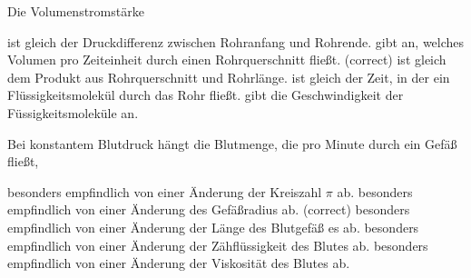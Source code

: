 \documentclass[11pt]{exam}
\begin{document}
\begin{questions}
\vspace{3mm}\question Die Volumenstromstärke

\begin{choices}
	\choice ist gleich der Druckdifferenz zwischen Rohranfang und Rohrende.
	\choice gibt an, welches Volumen pro Zeiteinheit durch einen Rohrquerschnitt fließt. (correct)
	\choice ist gleich dem Produkt aus Rohrquerschnitt und Rohrlänge.
	\choice ist gleich der Zeit, in der ein Flüssigkeitsmolekül durch das Rohr fließt.
	\choice gibt die Geschwindigkeit der Füssigkeitsmoleküle an.
\end{choices}

\vspace{3mm}\question Bei konstantem Blutdruck hängt die Blutmenge, die pro Minute durch ein Gefäß fließt,

\begin{choices}
	\choice besonders empfindlich von einer Änderung der Kreiszahl \(\pi\) ab.
	\choice besonders empfindlich von einer Änderung des Gefäßradius ab. (correct)
	\choice besonders empfindlich von einer Änderung der Länge des Blutgefäß es ab.
	\choice besonders empfindlich von einer Änderung der Zähflüssigkeit des Blutes ab.
	\choice besonders empfindlich von einer Änderung der Viskosität des Blutes ab.
\end{choices}

\vspace{3mm}\end{questions}
\end{document}
